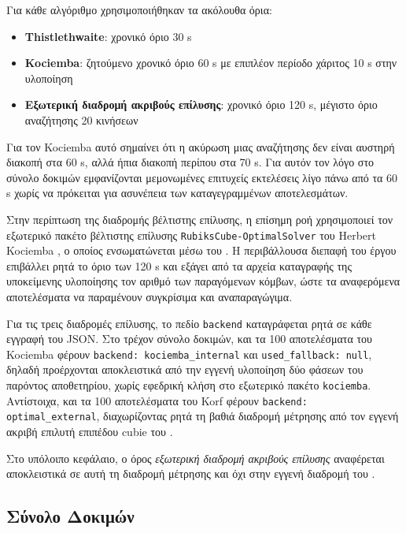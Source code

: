 Για κάθε αλγόριθμο χρησιμοποιήθηκαν τα ακόλουθα όρια:
\begin{itemize}
    \item \textbf{Thistlethwaite}: χρονικό όριο 30 s
    \item \textbf{Kociemba}: ζητούμενο χρονικό όριο 60 s με επιπλέον περίοδο χάριτος 10 s στην υλοποίηση
    \item \textbf{Εξωτερική διαδρομή ακριβούς επίλυσης}: χρονικό όριο 120 s, μέγιστο όριο αναζήτησης 20 κινήσεων
\end{itemize}

Για τον Kociemba αυτό σημαίνει ότι η ακύρωση μιας αναζήτησης δεν είναι
αυστηρή διακοπή στα 60 s, αλλά ήπια διακοπή περίπου στα 70 s. Για αυτόν τον λόγο
στο σύνολο δοκιμών εμφανίζονται μεμονωμένες επιτυχείς εκτελέσεις λίγο πάνω
από τα 60 s χωρίς να πρόκειται για ασυνέπεια των καταγεγραμμένων αποτελεσμάτων.

Στην περίπτωση της διαδρομής βέλτιστης επίλυσης, η επίσημη ροή χρησιμοποιεί τον
εξωτερικό πακέτο βέλτιστης επίλυσης \texttt{RubiksCube-OptimalSolver} του Herbert
Kociemba \cite{kociemba_rubiks_optimal}, ο οποίος ενσωματώνεται μέσω του
. Η περιβάλλουσα διεπαφή του έργου επιβάλλει ρητά το
όριο των 120 s και εξάγει από τα αρχεία καταγραφής της υποκείμενης υλοποίησης τον αριθμό των παραγόμενων
κόμβων, ώστε τα αναφερόμενα αποτελέσματα να παραμένουν συγκρίσιμα και
αναπαραγώγιμα.

Για τις τρεις διαδρομές επίλυσης, το πεδίο \texttt{backend} καταγράφεται ρητά σε κάθε εγγραφή του JSON. Στο τρέχον σύνολο δοκιμών, και τα 100 αποτελέσματα του Kociemba φέρουν \texttt{backend: kociemba\_internal} και \texttt{used\_fallback: null}, δηλαδή προέρχονται αποκλειστικά από την εγγενή υλοποίηση δύο φάσεων του παρόντος αποθετηρίου, χωρίς εφεδρική κλήση στο εξωτερικό πακέτο \texttt{kociemba}. Αντίστοιχα, και τα 100 αποτελέσματα του Korf φέρουν \texttt{backend: optimal\_external}, διαχωρίζοντας ρητά τη βαθιά διαδρομή μέτρησης από τον εγγενή ακριβή επιλυτή επιπέδου cubie του .

Στο υπόλοιπο κεφάλαιο, ο όρος \emph{εξωτερική διαδρομή ακριβούς επίλυσης} αναφέρεται αποκλειστικά σε αυτή τη διαδρομή μέτρησης και όχι στην εγγενή διαδρομή του .

\subsection{Σύνολο Δοκιμών}

